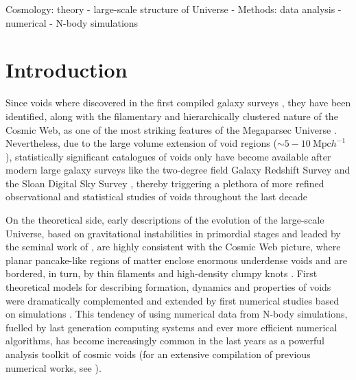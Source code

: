 \documentclass[a4,useAMS,usenatbib,usegraphicx]{latex/mn2e}
\begin{document}
\begin{keywords}
Cosmology: theory - large-scale structure of Universe -
Methods: data analysis - numerical - N-body simulations
\end{keywords}



\section{Introduction}
\label{sec:introduction}


Since voids where discovered in the first compiled galaxy surveys 
\citep{Chincarini75, Gregory78, Einasto80M, Einasto80N, Kirshner81, 
Kirshner87}, they have been identified, along with the filamentary and 
hierarchically clustered nature of the Cosmic Web, as one of the most 
striking features of the Megaparsec Universe \citep{Bond96}. Nevertheless,
due to the large volume extension of void regions ($\sim 5-10\ \mbox{Mpc} 
h^{-1}$), statistically significant catalogues of voids \citep{Pan10, 
Sutter12b, Nadathur14} only have become available after modern large 
galaxy surveys like the two-degree field Galaxy Redshift Survey \citep{
Colless01, Colless03} and the Sloan Digital Sky Survey \citep{York00,
Abazajian03}, thereby triggering a plethora of more refined observational 
and statistical studies of voids throughout the last decade \citep{Hoyle04,
Croton04, Rojas05, Ceccarelli06, Patiri06a, Tikhonov06, Patiri06b, 
Tikhonov07, BendaBeckmann08, Foster09, Ceccarelli13, Sutter14a}



On the theoretical side, early descriptions of the evolution of the 
large-scale Universe, based on gravitational instabilities in primordial 
stages and leaded by the seminal work of \citet{Zeldovich70}, are highly 
consistent with the Cosmic Web picture, where planar pancake-like regions 
of matter enclose enormous underdense voids and are bordered, in turn, by 
thin filaments and high-density clumpy knots \citep{Bond96}. First 
theoretical models for describing formation, dynamics and properties of 
voids \citep{Hoffman82, Icke84, Bertschinger85, Blumenthal92} were 
dramatically complemented and extended by first numerical studies based 
on simulations \citep{Martel90, Regos91, Weygaert93, Dubinski93}. This 
tendency of using numerical data from N-body simulations, fuelled by last 
generation computing systems and ever more efficient numerical algorithms, 
has become increasingly common in the last years as a powerful analysis 
toolkit of cosmic voids (for an extensive compilation of previous 
numerical works, see \citet{Colberg08}).
\end{document}
